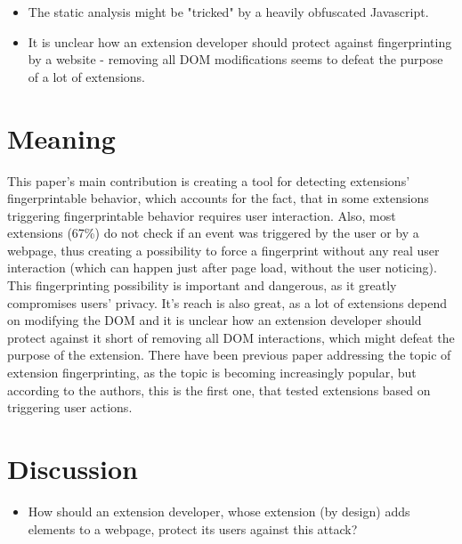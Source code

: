 \documentclass{article}
\begin{document}
\begin{itemize}
\item The static analysis might be "tricked" by a heavily obfuscated Javascript.
\item It is unclear how an extension developer should protect against fingerprinting by a website - removing all DOM modifications seems to defeat the purpose of a lot of extensions.
\end{itemize}

\section{Meaning}

This paper's main contribution is creating a tool for detecting extensions' fingerprintable behavior, which accounts for the fact, that in some extensions triggering fingerprintable behavior requires user interaction. Also, most extensions (67\%) do not check if an event was triggered by the user or by a webpage, thus creating a possibility to force a fingerprint without any real user interaction (which can happen just after page load, without the user noticing). This fingerprinting possibility is important and dangerous, as it greatly compromises users' privacy. It's reach is also great, as a lot of extensions depend on modifying the DOM and it is unclear how an extension developer should protect against it short of removing all DOM interactions, which might defeat the purpose of the extension. There have been previous paper addressing the topic of extension fingerprinting, as the topic is becoming increasingly popular, but according to the authors, this is the first one, that tested extensions based on triggering user actions.

\section{Discussion}

\begin{itemize}
	\item How should an extension developer, whose extension (by design) adds elements to a webpage, protect its users against this attack?
\end{itemize}
\end{document}
